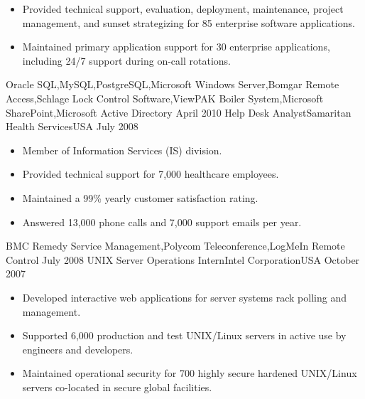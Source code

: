 \documentclass[localFont,alternative]{yaac-another-awesome-cv}
\begin{document}
\begin{experiences}
{\begin{itemize}
                        \item Provided technical support, evaluation, deployment, maintenance, project management, and sunset strategizing for 85 enterprise software applications.                       
                        \item Maintained primary application support for 30 enterprise applications, including 24/7 support during on-call rotations.                                                                   
                      \end{itemize}
                    }
    {Oracle SQL,MySQL,PostgreSQL,Microsoft Windows Server,Bomgar Remote Access,Schlage Lock Control Software,ViewPAK Boiler System,Microsoft SharePoint,Microsoft Active Directory}
  \emptySeparator
  \experience
    {April 2010}    {Help Desk Analyst}{Samaritan Health Services}{USA}
    {July 2008}     {
                      \begin{itemize}
                        \item Member of Information Services (IS) division.
                        \item Provided technical support for 7,000 healthcare employees.
                        \item Maintained a 99\% yearly customer satisfaction rating.
                        \item Answered 13,000 phone calls and 7,000 support emails per year.                                                                   
                      \end{itemize}
                    }
    {BMC Remedy Service Management,Polycom Teleconference,LogMeIn Remote Control}
  \emptySeparator
  \experience
    {July 2008}    {UNIX Server Operations Intern}{Intel Corporation}{USA}
    {October 2007}  {
                      \begin{itemize}
                        \item Developed interactive web applications for server systems rack polling and management.
                        \item Supported 6,000 production and test UNIX/Linux servers in active use by engineers and developers.
                        \item Maintained operational security for 700 highly secure hardened UNIX/Linux servers co-located in secure global facilities.                                                                   
                      \end{itemize}
                    }

\end{experiences}
\end{document}
